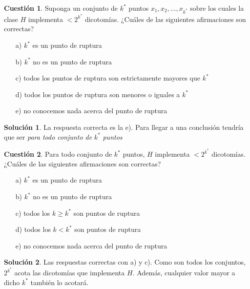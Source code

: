 \documentclass[a4paper, 11pt]{article}
\theoremstyle{definition}
\newtheorem{cuestion}{Cuestión}
\newtheorem*{solucion}{Solución}
\begin{document}
  \begin{cuestion}
  Suponga un conjunto de $k^*$ puntos $x_1,x_2,...,x_{k^*}$ sobre los cuales la clase $H$ implementa $<2^{k^*}$ dicotomías. ¿Cuáles de las siguientes afirmaciones son correctas?
  \begin{enumerate}
  \item[a)] $k^*$ es un punto de ruptura
  \item[b)] $k^*$ no es un punto de ruptura
  \item[c)] todos los puntos de ruptura son estrictamente mayores que $k^*$
  \item[d)] todos los puntos de ruptura son menores o iguales a $k^*$
  \item[e)] no conocemos nada acerca del punto de ruptura
  \end{enumerate}

  \end{cuestion}

  \begin{solucion}
    La respuesta correcta es la e). Para llegar a una conclusión tendría que ser \emph{para todo conjunto de} $k^*$ \emph{puntos}
  \end{solucion}

  \begin{cuestion}
  Para todo conjunto de $k^*$ puntos, $H$ implementa $<2^{k^*}$ dicotomías. ¿Cuáles de las siguientes afirmaciones son correctas?
  \begin{enumerate}
  \item[a)] $k^*$ es un punto de ruptura
  \item[b)] $k^*$ no es un punto de ruptura
  \item[c)] todos los $k \geq k^*$ son puntos de ruptura
  \item[d)] todos los $k < k^*$ son puntos de ruptura
  \item[e)] no conocemos nada acerca del punto de ruptura
  \end{enumerate}
  \end{cuestion}

  \begin{solucion}
    Las respuestas correctas con a) y c). Como son todos los conjuntos, $2^{k^*}$ acota las dicotomías que implementa $H$. Además, cualquier valor mayor a dicho $k^*$ también lo acotará.
  \end{solucion}
\end{document}
